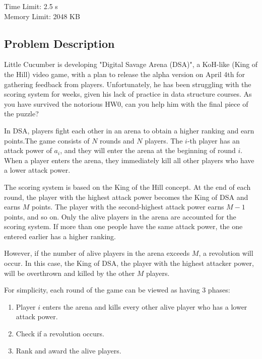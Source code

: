 \providecommand{\tightlist}{\setlength{\itemsep}{0pt}\setlength{\parskip}{0pt}}
\setcounter{secnumdepth}{0}

Time Limit: 2.5 s \\
Memory Limit: 2048 KB

\subsection{Problem Description}\label{problem-description}

Little Cucumber is developing "Digital Savage Arena (DSA)", a KoH-like (King of the Hill) video game, with a plan to release the alpha version on April 4th for gathering feedback from players. Unfortunately, he has been struggling with the scoring system for weeks, given his lack of practice in data structure courses. As you have survived the notorious HW0, can you help him with the final piece of the puzzle?

In DSA, players fight each other in an arena to obtain a higher ranking and earn points.The game consists of $N$ rounds and $N$ players. The $i$-th player has an attack power of $a_i$, and they will enter the arena at the beginning of round $i$. When a player enters the arena, they immediately kill all other players who have a lower attack power. 

The scoring system is based on the King of the Hill concept. At the end of each round, the player with the highest attack power becomes the King of DSA and earns $M$ points. The player with the second-highest attack power earns $M-1$ points, and so on. Only the alive players in the arena are accounted for the scoring system. If more than one people have the same attack power, the one entered earlier has a higher ranking. 

However, if the number of alive players in the arena exceeds $M$, a revolution will occur. In this case, the King of DSA, the player with the highest attacker power, will be overthrown and killed by the other $M$ players. 

For simplicity, each round of the game can be viewed as having 3 phases:
\begin{enumerate}
\tightlist
    \item Player $i$ enters the arena and kills every other alive player who has a lower attack power. 
    \item Check if a revolution occurs. 
    \item Rank and award the alive players. 
\end{enumerate}


